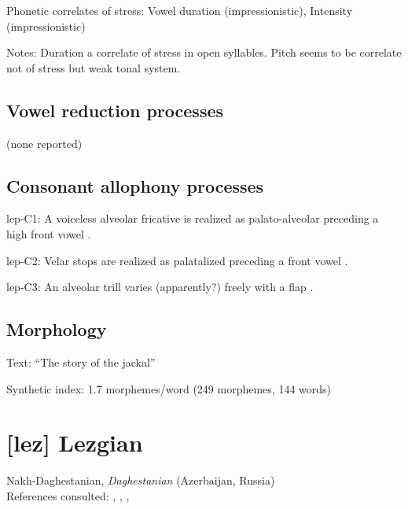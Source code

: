 {\begin{appendixdesc}
\item[Phonetic correlates of stress:] Vowel duration (impressionistic), Intensity (impressionistic)

\item[Notes:] Duration a correlate of stress in open syllables. Pitch seems to be correlate not of stress but weak tonal system.
\end{appendixdesc}
\subsection*{Vowel reduction processes}

(none reported)
\subsection*{Consonant allophony processes}
\begin{appendixdesc}

\item[lep-C1:] A voiceless alveolar fricative is realized as palato-alveolar preceding a high front vowel \citep[27]{Plaisier2007}.

\item[lep-C2:] Velar stops are realized as palatalized preceding a front vowel \citep[21]{Plaisier2007}.

\item[lep-C3:] An alveolar trill varies (apparently?) freely with a flap \citep[28]{Plaisier2007}.
\end{appendixdesc}
\subsection*{Morphology}

\begin{appendixdesc}

\item[Text:] “The story of the jackal” \citep[165--168]{Plaisier2007}

\item[Synthetic index:] 1.7 morphemes/word (249 morphemes, 144 words)
\end{appendixdesc}
\section*{[lez] Lezgian}  %
Nakh-Daghestanian, \textit{Daghestanian} (Azerbaijan, Russia)\medskip\\
References consulted: \citet{ChitoranBabaliyeva2007}, \citet{Haspelmath1993}, \citet{Kodzasov1990}, \citet{Yu2004}

}
